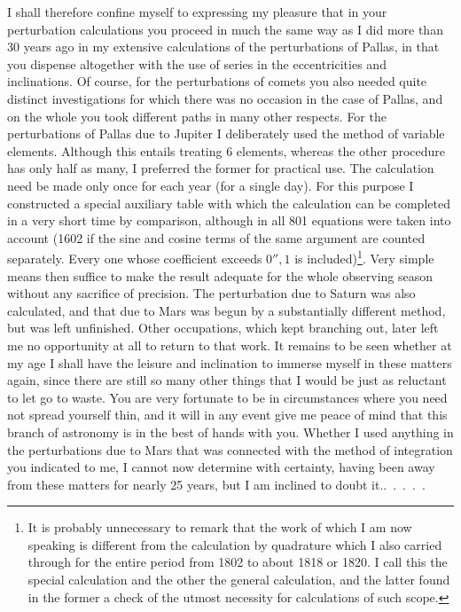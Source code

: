 \par I shall therefore confine myself to expressing my pleasure that in your perturbation calculations you proceed in much the same way as I did more than 30 years ago in my extensive calculations of the perturbations of Pallas, in that you dispense altogether with the use of series in the eccentricities and inclinations. Of course, for the perturbations of comets you also needed quite distinct investigations for which there was no occasion in the case of Pallas, and on the whole you took different paths in many other respects. For the perturbations of Pallas due to Jupiter I deliberately used the method of variable elements. Although this entails treating 6 elements, whereas the other procedure has only half as many, I preferred the former for practical use. The calculation need be made only once for each year (for a single day). For this purpose I constructed a special auxiliary table with which the calculation can be completed in a very short time by comparison, although in all 801 equations were taken into account (1602 if the sine and cosine terms of the same argument are counted separately. Every one whose coefficient exceeds \(0''{,}1\) is included)\footnote{It is probably unnecessary to remark that the work of which I am now speaking is  different from the calculation by quadrature which I also carried through for the entire period from 1802 to about 1818 or 1820. I call this the special calculation and the other the general calculation, and the latter found in the former a check of the utmost necessity for calculations of such scope.}. Very simple means then suffice to make the result adequate for the whole observing season without any sacrifice of precision. The perturbation due to Saturn was also calculated, and that due to Mars was begun by a substantially different method, but was left unfinished. Other occupations, which kept branching out, later left me no opportunity at all to return to that work. It remains to be seen whether at my age I shall have the leisure and inclination to immerse myself in these matters again, since there are still so many other things that I would be just as reluctant to let go to waste. You are very fortunate to be in circumstances where you need not spread yourself thin, and it will in any event give me peace of mind that this branch of astronomy is in the best of hands with you. Whether I used anything in the perturbations due to Mars that was connected with the method of integration you indicated to me, I cannot now determine with certainty, having been away from these matters for nearly 25 years, but I am inclined to doubt it.\quad\mbox{. . . . .}
\par
